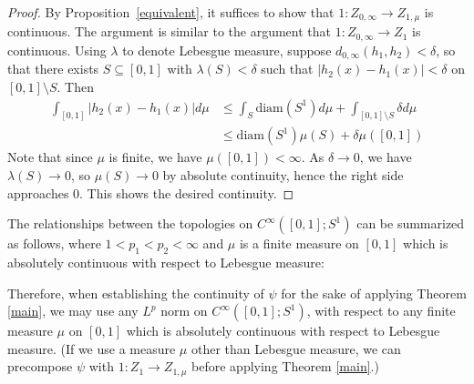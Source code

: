 \documentclass[11pt, reqno, english]{amsart}
\theoremstyle{plain}
\theoremstyle{definition}
\begin{document}
\begin{proof}
  By Proposition~\ref{equivalent}, it suffices to show that $1\colon Z_{0, \infty}
  \rightarrow Z_{1, \mu}$ is continuous. The argument is similar to the
  argument that $1\colon Z_{0, \infty} \rightarrow Z_{1}$ is continuous. Using
  $\lambda$ to denote Lebesgue measure, suppose $d_{0, \infty}(h_{1}, h_{2}) <
  \delta$, so that there exists $S \subseteq [0, 1]$ with $\lambda(S) < \delta$
  such that $|h_{2}(x) - h_{1}(x)| < \delta$ on $[0, 1] \setminus S$. Then
  \begin{align*}
    \int_{[0, 1]}|h_{2}(x) - h_{1}(x)|d\mu &\le \int_{S}\text{diam}(S^{1})d\mu
    + \int_{[0, 1] \setminus S}\delta d\mu\\
    &\le \text{diam}(S^{1})\mu(S) + \delta\mu([0, 1])
  \end{align*}
  Note that since $\mu$ is finite, we have $\mu([0, 1]) < \infty$. As $\delta
  \rightarrow 0$, we have $\lambda(S) \rightarrow 0$, so $\mu(S) \rightarrow 0$
  by absolute continuity, hence the right side approaches 0. This shows the
  desired continuity.
\end{proof}

The relationships between the topologies on $C^{\infty}([0, 1]; S^{1})$ can be
summarized as follows, where $1 < p_{1} < p_{2} < \infty$ and $\mu$ is a finite
measure on $[0, 1]$ which is absolutely continuous with respect to Lebesgue
measure:
\begin{center}
\end{center}

Therefore, when establishing the continuity of $\psi$ for the sake of applying
Theorem \ref{main}, we may use any $L^{p}$ norm on $C^{\infty}([0, 1]; S^{1})$,
with respect to any finite measure $\mu$ on $[0, 1]$ which is absolutely
continuous with respect to Lebesgue measure. (If we use a measure $\mu$ other
than Lebesgue measure, we can precompose $\psi$ with $1\colon Z_{1} \rightarrow
Z_{1, \mu}$ before applying Theorem \ref{main}.)
\end{document}
